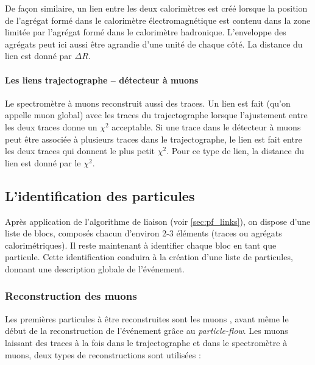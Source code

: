 De façon similaire, un lien entre les deux calorimètres est créé lorsque la position de l'agrégat formé dans le calorimètre électromagnétique est contenu dans la zone limitée par l'agrégat formé dans le calorimètre hadronique. L'enveloppe des agrégats peut ici aussi être agrandie d'une unité de chaque côté. La distance du lien est donné par $\Delta R$. %

\paragraph{Les liens trajectographe – détecteur à muons} \label{sec:pf_link_mu}

Le spectromètre à muons reconstruit aussi des traces. Un lien est fait (qu'on appelle muon global) avec les traces du trajectographe lorsque l'ajustement entre les deux traces donne un $\chi^2$ acceptable. Si une trace dans le détecteur à muons peut être associée à plusieurs traces dans le trajectographe, le lien est fait entre les deux traces qui donnent le plus petit $\chi^2$. Pour ce type de lien, la distance du lien est donné par le $\chi^2$.

\subsection{L'identification des particules}

Après application de l'algorithme de liaison (voir \cref{sec:pf_links}), on dispose d'une liste de blocs, composés chacun d'environ 2-3 éléments (traces ou agrégats calorimétriques). Il reste maintenant à identifier chaque bloc en tant que particule. Cette identification conduira à la création d'une liste de particules, donnant une description globale de l'événement.

\subsubsection{Reconstruction des muons} \label{sec:muon_reco}

Les premières particules à être reconstruites sont les muons \citep{cms_muons_reco}, avant même le début de la reconstruction de l'événement grâce au \emph{particle-flow}. Les muons laissant des traces à la fois dans le trajectographe et dans le spectromètre à muons, deux types de reconstructions sont utilisées :

